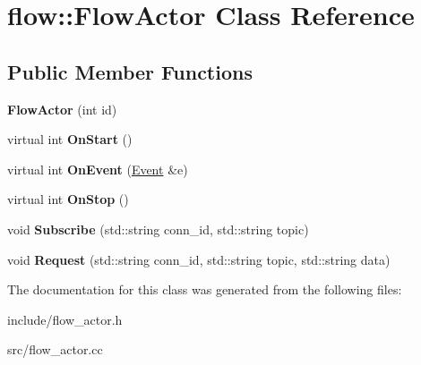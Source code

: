 \hypertarget{classflow_1_1_flow_actor}{}\section{flow\+:\+:Flow\+Actor Class Reference}
\label{classflow_1_1_flow_actor}
\subsection*{Public Member Functions}
\begin{DoxyCompactItemize}
\item 
{\bfseries Flow\+Actor} (int id)\hypertarget{classflow_1_1_flow_actor_a6440b79d7e8e69498dab60699e5cc696}{}\label{classflow_1_1_flow_actor_a6440b79d7e8e69498dab60699e5cc696}

\item 
virtual int {\bfseries On\+Start} ()\hypertarget{classflow_1_1_flow_actor_aad89466fbb00bab1a6e39942b6ff19bd}{}\label{classflow_1_1_flow_actor_aad89466fbb00bab1a6e39942b6ff19bd}

\item 
virtual int {\bfseries On\+Event} (\hyperlink{class_event}{Event} \&e)\hypertarget{classflow_1_1_flow_actor_a98446e4f507dcb5fc077244b2e1ee573}{}\label{classflow_1_1_flow_actor_a98446e4f507dcb5fc077244b2e1ee573}

\item 
virtual int {\bfseries On\+Stop} ()\hypertarget{classflow_1_1_flow_actor_a2f0c63cd3b63578749c4cd78309cf3a6}{}\label{classflow_1_1_flow_actor_a2f0c63cd3b63578749c4cd78309cf3a6}

\item 
void {\bfseries Subscribe} (std\+::string conn\+\_\+id, std\+::string topic)\hypertarget{classflow_1_1_flow_actor_a3dd944b5538de445443713bd56897c5c}{}\label{classflow_1_1_flow_actor_a3dd944b5538de445443713bd56897c5c}

\item 
void {\bfseries Request} (std\+::string conn\+\_\+id, std\+::string topic, std\+::string data)\hypertarget{classflow_1_1_flow_actor_a4015e571671a52b427f3c77edbdc6f9d}{}\label{classflow_1_1_flow_actor_a4015e571671a52b427f3c77edbdc6f9d}

\end{DoxyCompactItemize}


The documentation for this class was generated from the following files\+:\begin{DoxyCompactItemize}
\item 
include/flow\+\_\+actor.\+h\item 
src/flow\+\_\+actor.\+cc\end{DoxyCompactItemize}
